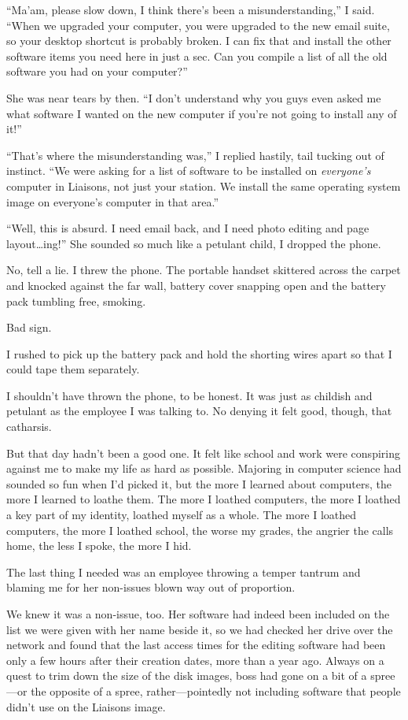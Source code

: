 ``Ma'am, please slow down, I think there's been a misunderstanding,'' I said. ``When we upgraded your computer, you were upgraded to the new email suite, so your desktop shortcut is probably broken. I can fix that and install the other software items you need here in just a sec. Can you compile a list of all the old software you had on your computer?''

She was near tears by then. ``I don't understand why you guys even asked me what software I wanted on the new computer if you're not going to install any of it!''

``That's where the misunderstanding was,'' I replied hastily, tail tucking out of instinct. ``We were asking for a list of software to be installed on \emph{everyone's} computer in Liaisons, not just your station. We install the same operating system image on everyone's computer in that area.''

``Well, this is absurd. I need email back, and I need photo editing and page layout\ldots{}ing!'' She sounded so much like a petulant child, I dropped the phone.

No, tell a lie. I threw the phone. The portable handset skittered across the carpet and knocked against the far wall, battery cover snapping open and the battery pack tumbling free, smoking.

Bad sign.

I rushed to pick up the battery pack and hold the shorting wires apart so that I could tape them separately.

I shouldn't have thrown the phone, to be honest. It was just as childish and petulant as the employee I was talking to. No denying it felt good, though, that catharsis.

But that day hadn't been a good one. It felt like school and work were conspiring against me to make my life as hard as possible. Majoring in computer science had sounded so fun when I'd picked it, but the more I learned about computers, the more I learned to loathe them. The more I loathed computers, the more I loathed a key part of my identity, loathed myself as a whole. The more I loathed computers, the more I loathed school, the worse my grades, the angrier the calls home, the less I spoke, the more I hid.

The last thing I needed was an employee throwing a temper tantrum and blaming me for her non-issues blown way out of proportion.

We knew it was a non-issue, too. Her software had indeed been included on the list we were given with her name beside it, so we had checked her drive over the network and found that the last access times for the editing software had been only a few hours after their creation dates, more than a year ago. Always on a quest to trim down the size of the disk images, boss had gone on a bit of a spree---or the opposite of a spree, rather---pointedly not including software that people didn't use on the Liaisons image.

